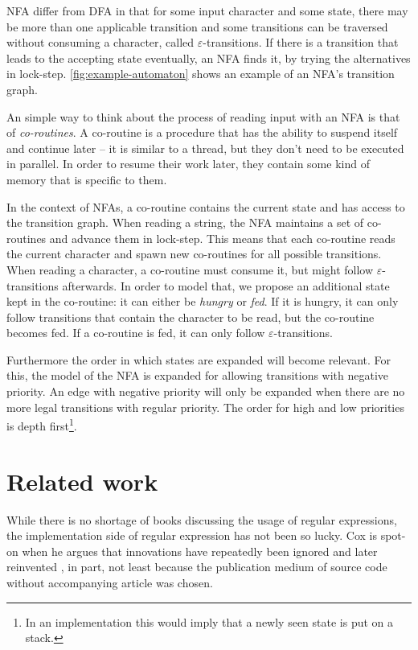 \documentclass[11pt,a4paper,twoside,openright]{Thesis}
\theoremstyle{definition}
\newcommand{\seclabel}[1]{\label{sec:#1}}
\begin{document}
NFA differ from DFA in that for some input character and some state, there
may be more than one applicable transition and some transitions can be
traversed without consuming a character, called $\varepsilon$-transitions.  If
there is a transition that leads to the accepting state eventually, an NFA
finds it, by trying the alternatives in lock-step.
\autoref{fig:example-automaton} shows an example of an NFA's transition graph.

An simple way to think about the process of reading input with an NFA is that
of \emph{co-routines}. A co-routine is a procedure that has the ability to
suspend itself and continue later -- it is similar to a thread, but they
don't need to be executed in parallel. In order to resume their work later,
they contain some kind of memory that is specific to them.

In the context of NFAs, a co-routine contains the current state and has access
to the transition graph. When reading a
string, the NFA maintains a set of co-routines and advance them in
lock-step. This means that each co-routine reads the current character and
spawn new co-routines for all possible transitions. When reading a character,
a co-routine must consume it, but might follow $\varepsilon$-transitions
afterwards. In order to model that, we propose an additional state kept in
the co-routine: it can either be \emph{hungry} or \emph{fed}. If it is
hungry, it can only follow transitions that contain the character to be read,
but the co-routine becomes fed. If a co-routine is fed, it can only
follow $\varepsilon$-transitions.

Furthermore the order in which states are expanded will become relevant. For
this, the model of the NFA is expanded for allowing transitions with negative
priority. An edge with negative priority will only be expanded when there are
no more legal transitions with regular priority. The order for high and low
priorities is depth first\footnote{In an implementation this would imply that
a newly seen state is put on a stack.}.

\chapter{Related work}
\seclabel{related}
While there is no shortage of books discussing the usage of regular
expressions, the implementation side of regular expression has not
been so lucky. Cox is spot-on when he argues that innovations have
repeatedly been ignored and later reinvented \cite{Cox07a,Cox09a,Cox10a}, in 
part, not least because the publication medium of source code without
accompanying article was chosen.
\end{document}

